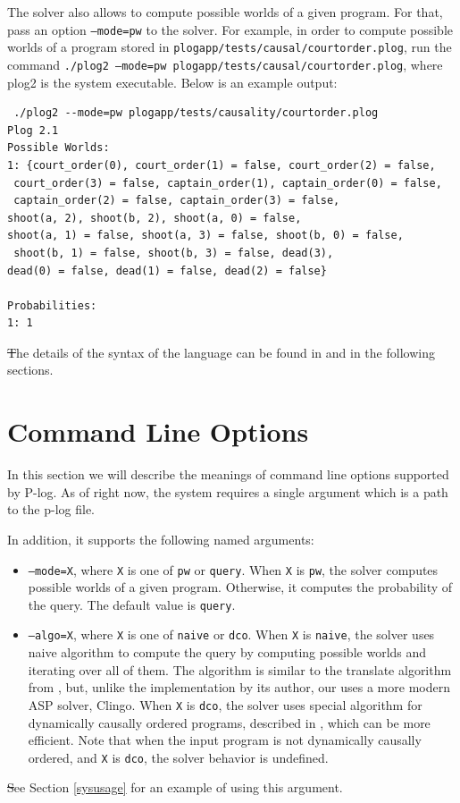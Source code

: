 \documentclass[12pt, letterpaper]{article}
\begin{document}
The solver also allows to compute possible worlds of a given program. For that, pass an option  \texttt{--mode=pw} to the solver.
For example, in order to compute possible worlds of a program stored in \texttt{plogapp/tests/causal/courtorder.plog}, run the command
\texttt{./plog2 --mode=pw  plogapp/tests/causal/courtorder.plog}, where plog2 is the system executable.
Below is an example output:
\begin{verbatim}
 ./plog2 --mode=pw plogapp/tests/causality/courtorder.plog 
Plog 2.1
Possible Worlds:
1: {court_order(0), court_order(1) = false, court_order(2) = false,
 court_order(3) = false, captain_order(1), captain_order(0) = false,
 captain_order(2) = false, captain_order(3) = false, 
shoot(a, 2), shoot(b, 2), shoot(a, 0) = false, 
shoot(a, 1) = false, shoot(a, 3) = false, shoot(b, 0) = false,
 shoot(b, 1) = false, shoot(b, 3) = false, dead(3), 
dead(0) = false, dead(1) = false, dead(2) = false}

Probabilities:
1: 1
\end{verbatim}
\st
The details of the syntax of the language can be found in \cite{Balai2019} and in the following sections. 

\section{Command Line Options}\label{option}

In this section we will describe the meanings of command line options supported by
P-log. As of right now, the system requires  a single argument which is a path to the p-log file.

\medskip\noindent
In addition, it supports the following named arguments:
\begin{itemize}
\item \texttt{--mode=X}, where \texttt{X} is one of \texttt{pw} or \texttt{query}. When \texttt{X} is \texttt{pw}, the solver computes possible worlds of a given program. Otherwise, it computes the probability of the query. The default value is \texttt{query}.
\end{itemize}

  \begin{itemize}
  \item \texttt{--algo=X}, where \texttt{X} is one of \texttt{naive} or \texttt{dco}. When \texttt{X} is \texttt{naive}, the solver uses naive algorithm to compute the query by computing possible worlds and iterating over all of them. The algorithm is similar to the translate algorithm from \cite{zhu2012plog}, but, unlike the implementation by its author, our uses a more modern ASP solver, Clingo. When \texttt{X} is \texttt{dco}, the solver uses special algorithm for dynamically causally ordered programs, described in \cite{balai2017investigating}, which can be more efficient. Note that when the input program is not dynamically causally ordered, and \texttt{X} is \texttt{dco}, the solver behavior is undefined. 
\end{itemize}
\st
See Section \ref{sysusage} for an example of using this argument.
\end{document}
